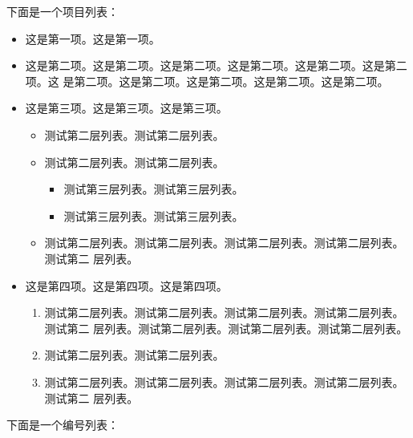 下面是一个项目列表：

\begin{itemize}
\item 这是第一项。这是第一项。
\item 这是第二项。这是第二项。这是第二项。这是第二项。这是第二项。这是第二项。这
  是第二项。这是第二项。这是第二项。这是第二项。这是第二项。
\item 这是第三项。这是第三项。这是第三项。
  \begin{itemize}
  \item 测试第二层列表。测试第二层列表。
  \item 测试第二层列表。测试第二层列表。
  \begin{itemize}
     \item 测试第三层列表。测试第三层列表。
     \item 测试第三层列表。测试第三层列表。
  \end{itemize}
  \item 测试第二层列表。测试第二层列表。测试第二层列表。测试第二层列表。测试第二
    层列表。
  \end{itemize}
\item 这是第四项。这是第四项。这是第四项。
  \begin{enumerate}
  \item 测试第二层列表。测试第二层列表。测试第二层列表。测试第二层列表。测试第二
    层列表。测试第二层列表。测试第二层列表。测试第二层列表。
  \item 测试第二层列表。测试第二层列表。
  \item 测试第二层列表。测试第二层列表。测试第二层列表。测试第二层列表。测试第二
    层列表。
  \end{enumerate}
\end{itemize}

下面是一个编号列表：

